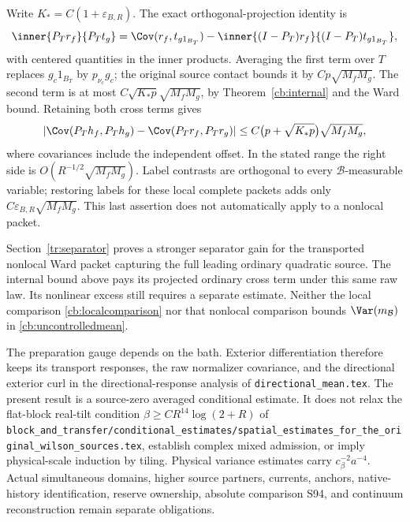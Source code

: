 Write \(K_*=C(1+\varepsilon_{B,R})\). The exact orthogonal-projection identity is
\[
 \inner{P_Tr_f}{P_Tt_g}
 =\Cov(r_f,t_{g1_{B_T}})
  -\inner{(I-P_T)r_f}{(I-P_T)t_{g1_{B_T}}},
\]
with centered quantities in the inner products. Averaging the first term over \(T\) replaces \(g_c1_{B_T}\) by \(p_{\nu_c}g_c\); the original source contact bounds it by \(Cp\sqrt{M_fM_g}\). The second term is at most \(C\sqrt{K_*p}\sqrt{M_fM_g}\), by Theorem~\ref{cb:internal} and the Ward bound. Retaining both cross terms gives
\begin{equation}
 \left|\Cov(P_Th_f,P_Th_g)-\Cov(P_Tr_f,P_Tr_g)\right|
 \le C\bigl(p+\sqrt{K_*p}\bigr)\sqrt{M_fM_g},
 \label{cb:localcomparison}
\end{equation}
where covariances include the independent offset. In the stated range the right side is \(O(R^{-1/2}\sqrt{M_fM_g})\). Label contrasts are orthogonal to every \(\mathcal B\)-measurable variable; restoring labels for these local complete packets adds only \(C\varepsilon_{B,R}\sqrt{M_fM_g}\). This last assertion does not automatically apply to a nonlocal packet.

Section~\ref{tr:separator} proves a stronger separator gain for the transported nonlocal Ward packet capturing the full leading ordinary quadratic source. The internal bound above pays its projected ordinary cross term under this same raw law. Its nonlinear excess still requires a separate estimate. Neither the local comparison \eqref{cb:localcomparison} nor that nonlocal comparison bounds \(\Var(m_{\mathcal B})\) in \eqref{cb:uncontrolledmean}.

The preparation gauge depends on the bath. Exterior differentiation therefore keeps its transport responses, the raw normalizer covariance, and the directional exterior curl in the directional-response analysis of \texttt{directional\_mean.tex}. The present result is a source-zero averaged conditional estimate. It does not relax the flat-block real-tilt condition \(\beta\ge CR^{14}\log(2+R)\) of \texttt{block\_and\_transfer/conditional\_estimates/spatial\_estimates\_for\_the\_original\_wilson\_sources.tex}, establish complex mixed admission, or imply physical-scale induction by tiling. Physical variance estimates carry \(c_\beta^{-2}a^{-4}\). Actual simultaneous domains, higher source partners, currents, anchors, native-history identification, reserve ownership, absolute comparison S94, and continuum reconstruction remain separate obligations.
